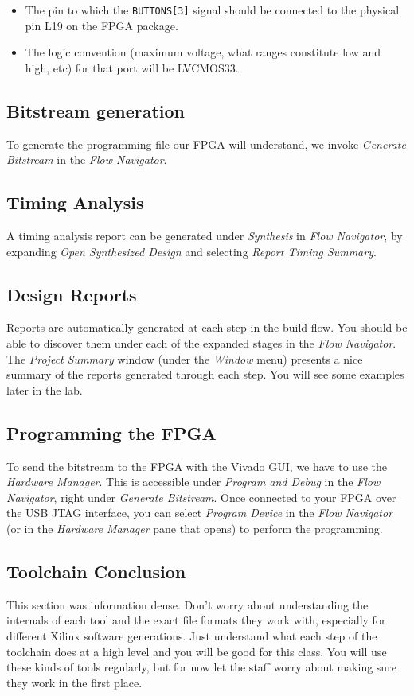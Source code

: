 \documentclass[11pt]{article}
\begin{document}
\begin{itemize}
\item The pin to which the \verb|BUTTONS[3]| signal should be connected to the physical pin L19 on the FPGA package.
\item The logic convention (maximum voltage, what ranges constitute low and high, etc) for that port will be LVCMOS33.
\end{itemize}

\subsection{Bitstream generation}
To generate the programming file our FPGA will understand, we invoke \emph{Generate Bitstream} in the \emph{Flow Navigator}.

\subsection{Timing Analysis}
A timing analysis report can be generated under \emph{Synthesis} in \emph{Flow Navigator}, by expanding \emph{Open Synthesized Design} and selecting \emph{Report Timing Summary}.

\subsection{Design Reports}
Reports are automatically generated at each step in the build flow. You should be able to discover them under each of the expanded stages in the \emph{Flow Navigator}. The \emph{Project Summary} window (under the \emph{Window} menu) presents a nice summary of the reports generated through each step. You will see some examples later in the lab.

\subsection{Programming the FPGA}
To send the bitstream to the FPGA with the Vivado GUI, we have to use the \emph{Hardware Manager}. This is accessible under \emph{Program and Debug} in the \emph{Flow Navigator}, right under \emph{Generate Bitstream}. Once connected to your FPGA over the USB JTAG interface, you can select \emph{Program Device} in the \emph{Flow Navigator} (or in the \emph{Hardware Manager} pane that opens) to perform the programming.

\subsection{Toolchain Conclusion}
This section was information dense. Don't worry about understanding the internals of each tool and the exact file formats they work with, especially for different Xilinx software generations. Just understand what each step of the toolchain does at a high level and you will be good for this class. You will use these kinds of tools regularly, but for now let the staff worry about making sure they work in the first place.
\end{document}
